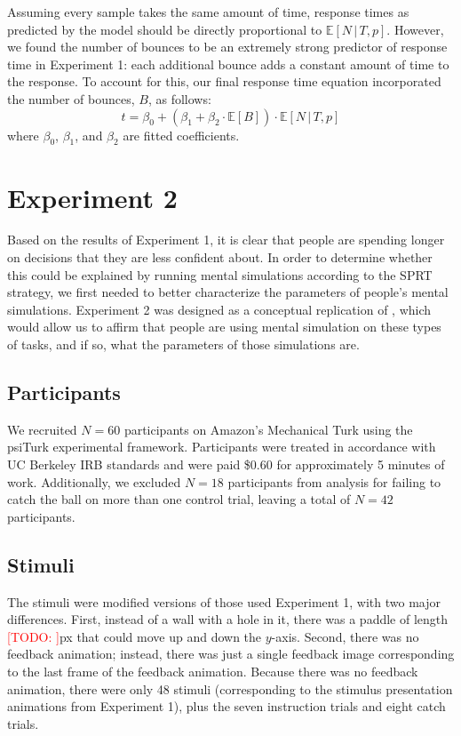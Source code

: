 \documentclass[10pt,letterpaper]{article}
\newcommand{\TODO}[1]{\textcolor{red}{[TODO: #1]}}
\begin{document}
Assuming every sample takes the same amount of time, response times as predicted by the model should be directly proportional to $\mathbb{E}[N\,|\,T,p]$. However, we found the number of bounces to be an extremely strong predictor of response time in Experiment 1: each additional bounce adds a constant amount of time to the response. To account for this, our final response time equation incorporated the number of bounces, $B$, as follows:
\begin{equation}
t = \beta_0 + (\beta_1 + \beta_2\cdot{}\mathbb{E}[B]) \cdot{}\mathbb{E}[N\,|\,T,p]
\label{eq:rt}
\end{equation}
where $\beta_0$, $\beta_1$, and $\beta_2$ are fitted coefficients.

\section{Experiment 2}

Based on the results of Experiment 1, it is clear that people are spending longer on decisions that they are less confident about. In order to determine whether this could be explained by running mental simulations according to the SPRT strategy, we first needed to better characterize the parameters of people's mental simulations. Experiment 2 was designed as a conceptual replication of , which would allow us to affirm that people are using mental simulation on these types of tasks, and if so, what the parameters of those simulations are.

\subsection{Participants}

We recruited $N=60$ participants on Amazon's Mechanical Turk using the psiTurk \cite{McDonnell12} experimental framework. Participants were treated in accordance with UC Berkeley IRB standards and were paid \$0.60 for approximately 5 minutes of work. Additionally, we excluded $N=18$ participants from analysis for failing to catch the ball on more than one control trial, leaving a total of $N=42$ participants.

\subsection{Stimuli}

The stimuli were modified versions of those used Experiment 1, with two major differences. First, instead of a wall with a hole in it, there was a paddle of length \TODO{}px that could move up and down the $y$-axis. Second, there was no feedback animation; instead, there was just a single feedback image corresponding to the last frame of the feedback animation. Because there was no feedback animation, there were only 48 stimuli (corresponding to the stimulus presentation animations from Experiment 1), plus the seven instruction trials and eight catch trials.
\end{document}
